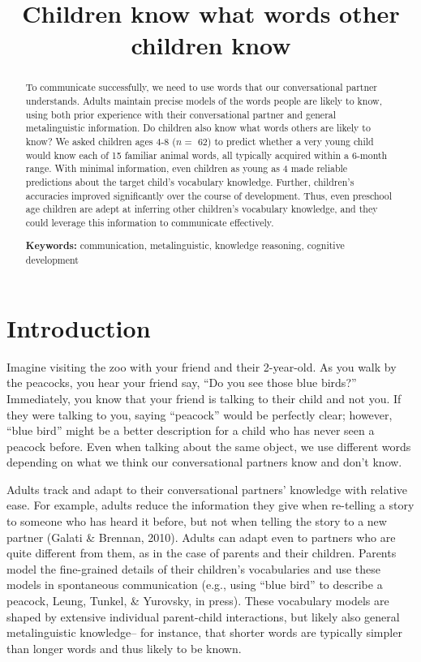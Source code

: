 \documentclass[10pt, letterpaper]{article}
\title{Children know what words other children know}
\begin{document}
\maketitle

\begin{abstract}
To communicate successfully, we need to use words that our
conversational partner understands. Adults maintain precise models of
the words people are likely to know, using both prior experience with
their conversational partner and general metalinguistic information. Do
children also know what words others are likely to know? We asked
children ages 4-8 (\(n =\) 62) to predict whether a very young child
would know each of 15 familiar animal words, all typically acquired
within a 6-month range. With minimal information, even children as young
as 4 made reliable predictions about the target child's vocabulary
knowledge. Further, children's accuracies improved significantly over
the course of development. Thus, even preschool age children are adept
at inferring other children's vocabulary knowledge, and they could
leverage this information to communicate effectively.

\textbf{Keywords:}
communication, metalinguistic, knowledge reasoning, cognitive
development
\end{abstract}

\hypertarget{introduction}{%
\section{Introduction}\label{introduction}}

Imagine visiting the zoo with your friend and their 2-year-old. As you
walk by the peacocks, you hear your friend say, ``Do you see those blue
birds?'' Immediately, you know that your friend is talking to their
child and not you. If they were talking to you, saying ``peacock'' would
be perfectly clear; however, ``blue bird'' might be a better description
for a child who has never seen a peacock before. Even when talking about
the same object, we use different words depending on what we think our
conversational partners know and don't know.

Adults track and adapt to their conversational partners' knowledge with
relative ease. For example, adults reduce the information they give when
re-telling a story to someone who has heard it before, but not when
telling the story to a new partner (Galati \& Brennan, 2010). Adults can
adapt even to partners who are quite different from them, as in the case
of parents and their children. Parents model the fine-grained details of
their children's vocabularies and use these models in spontaneous
communication (e.g., using {``blue bird''} to describe a peacock, Leung,
Tunkel, \& Yurovsky, in press). These vocabulary models are shaped by
extensive individual parent-child interactions, but likely also general
metalinguistic knowledge-- for instance, that shorter words are
typically simpler than longer words and thus likely to be known.
\end{document}
